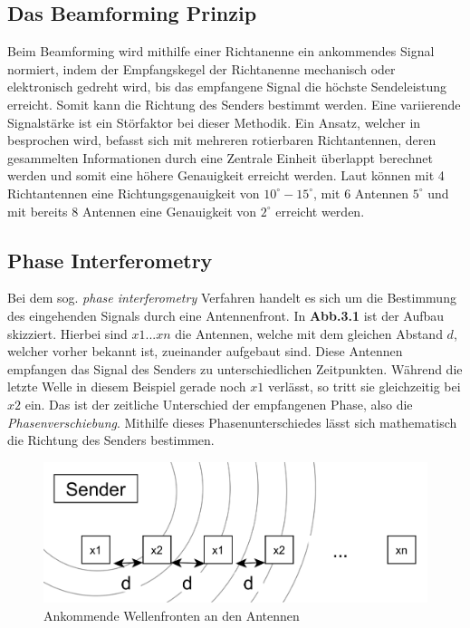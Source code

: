 \documentclass[12pt, a4wide]{scrreprt}
\begin{document}
    \subsection{Das Beamforming Prinzip}
Beim Beamforming wird mithilfe einer Richtanenne ein ankommendes Signal normiert, indem der Empfangskegel der Richtanenne mechanisch oder elektronisch gedreht wird, bis das empfangene Signal die höchste Sendeleistung erreicht. Somit kann die Richtung des Senders bestimmt werden. Eine variierende Signalstärke ist ein Störfaktor bei dieser Methodik. Ein Ansatz, welcher in \cite{q1} besprochen wird, befasst sich mit mehreren rotierbaren Richtantennen, deren gesammelten Informationen durch eine Zentrale Einheit überlappt berechnet werden und somit eine höhere Genauigkeit erreicht werden. Laut \cite{q1} können mit 4 Richtantennen eine Richtungsgenauigkeit von $10^\circ -15^\circ$, mit 6 Antennen $5^\circ$ und mit bereits 8 Antennen eine Genauigkeit von $2^\circ$ erreicht werden.
    \subsection{Phase Interferometry}
Bei dem sog. \textit{phase interferometry}\cite{q1} Verfahren handelt es sich um die Bestimmung des eingehenden Signals durch eine Antennenfront. In {\bf Abb.3.1} ist der Aufbau skizziert. Hierbei sind $x1...xn$ die Antennen, welche mit dem gleichen Abstand $d$, welcher vorher bekannt ist, zueinander aufgebaut sind. Diese Antennen empfangen das Signal des Senders zu unterschiedlichen Zeitpunkten. Während die letzte Welle in diesem Beispiel gerade noch $x1$ verlässt, so tritt sie gleichzeitig bei $x2$ ein. Das ist der zeitliche Unterschied der empfangenen Phase, also die \textit{Phasenverschiebung}. Mithilfe dieses Phasenunterschiedes lässt sich mathematisch die Richtung des Senders bestimmen.\\

\begin{figure}[!htb]
\centering
\includegraphics[scale=.3]{phase_int2.png}
\caption{Ankommende Wellenfronten an den Antennen}

\end{figure}
\newpage
\end{document}
